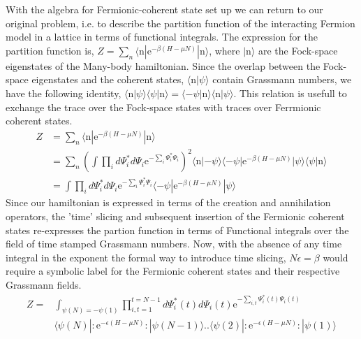 \documentclass[notitlepage,onecolumn,showpacs,11pt]{revtex4-1}
\begin{document}
With the algebra for Fermionic-coherent state set up we can return to our original problem, i.e. to describe the 
partition function of the interacting Fermion model in a lattice in terms of functional integrals. The expression for
the partition function is, $ Z=\sum_n\langle \text{n}|\text{e}^{-\beta\left(H-\mu N\right)}|\text{n}\rangle $, 
where $ |\text{n}\rangle $ are the Fock-space eigenstates of the Many-body hamiltonian. Since the overlap between 
the Fock-space eigenstates and the coherent states, $\langle \text{n}|\psi\rangle $ contain Grassmann numbers, we have the
following identity, $ \langle \text{n} |\psi\rangle\langle\psi|\text{n}\rangle=
\langle -\psi|\text{n}\rangle\langle\text{n}|\psi\rangle $. This relation is usefull to exchange the trace over
the Fock-space states with traces over Ferrmionic coherent states.
\begin{equation}
	\begin{aligned}
		Z&=\sum_n\langle\text{n}|\text{e}^{-\beta\left(H-\mu N\right)}|\text{n}\rangle \\
		 &=\sum_n\left(\int\prod_id\Psi^*_id\Psi_i\text{e}^{-\sum_i\Psi^*_i\Psi_i}\right)^2
		\langle\text{n}|-\psi\rangle\langle-\psi|\text{e}^{-\beta\left(H-\mu N\right)}|
		\psi\rangle\langle\psi|\text{n}\rangle \\
		&=\int\prod_id\Psi^*_id\Psi_i\text{e}^{-\sum_i\Psi^*_i\Psi_i}
		\langle-\psi|\text{e}^{-\beta\left(H-\mu N\right)}|\psi\rangle
	\end{aligned}
\end{equation}
Since our hamiltonian is expressed in terms
of the creation and annihilation operators, the 'time' slicing and subsequent insertion of the Fermionic coherent
states re-expresses the partion function in terms of Functional integrals over the field of time stamped Grassmann
numbers. Now, with the absence of any time integral in the exponent the formal way to introduce time slicing, 
$ N\epsilon = \beta $ would require a symbolic label for the Fermionic coherent states and their respective Grassmann fields.
\begin{equation}
	\begin{aligned}
		Z =&\int_{\psi(N)=-\psi(1)}\prod^{t=N-1 }_{i,t=1}d\Psi^*_i(t)d\Psi_i(t)
		\text{e}^{-\sum_{i,t}\Psi^*_i(t)\Psi_i(t)} \\
		&\langle\psi(N)|:\text{e}^{-\epsilon\left(H-\mu N\right)}:|\psi(N-1)\rangle..
		\langle\psi(2)|:\text{e}^{-\epsilon\left(H-\mu N\right)}:|\psi(1)\rangle
	\end{aligned}
\end{equation}
\end{document}
